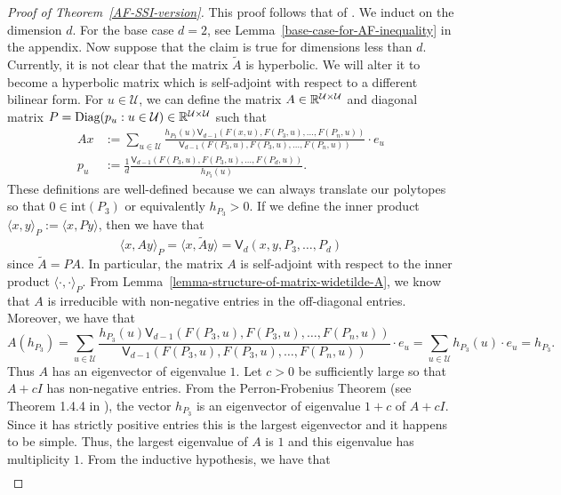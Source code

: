 \documentclass{puthesis-UG}
\begin{document}
\begin{proof}[Proof of Theorem~\ref{AF-SSI-version}]
	This proof follows that of \cite{bochner}. We induct on the dimension $d$. For the base case $d = 2$, see Lemma~\ref{base-case-for-AF-inequality} in the appendix. Now suppose that the claim is true for dimensions less than $d$. Currently, it is not clear that the matrix $\widetilde{A}$ is hyperbolic. We will alter it to become a hyperbolic matrix which is self-adjoint with respect to a different bilinear form. For $u \in \mathcal{U}$, we can define the matrix $A \in \mathbb{R}^{\mathcal{U} \times \mathcal{U}}$ and diagonal matrix $P = \text{Diag}(p_u : u \in \mathcal{U}) \in \mathbb{R}^{\mathcal{U} \times \mathcal{U}}$ such that 
	\begin{align*}
		Ax & := \sum_{u \in \mathcal{U}} \frac{h_{P_3}(u) \mathsf{V}_{d-1} (F(x, u), F(P_3, u), \ldots, F(P_n, u))}{\mathsf{V}_{d-1}(F(P_3, u), F(P_3, u), \ldots, F(P_n, u))} \cdot e_u\\
		p_u & := \frac{1}{d} \frac{\mathsf{V}_{d-1} (F(P_3, u), F(P_3, u), \ldots, F(P_d, u))}{h_{P_3}(u)}.
	\end{align*}
	These definitions are well-defined because we can always translate our polytopes so that $0 \in \text{int}(P_3)$ or equivalently $h_{P_3} > 0$. If we define the inner product $\langle x, y \rangle_{P} := \langle x, P y \rangle$, then we have that 
	\[
		\langle x, Ay \rangle_P = \langle x, \widetilde{A} y \rangle = \mathsf{V}_d (x, y, P_3, \ldots, P_d)
	\]
	since $\widetilde{A} = PA$. In particular, the matrix $A$ is self-adjoint with respect to the inner product $\langle \cdot, \cdot \rangle_P$. From Lemma~\ref{lemma-structure-of-matrix-widetilde-A}, we know that $A$ is irreducible with non-negative entries in the off-diagonal entries. Moreover, we have that 
	\[
		A(h_{P_3}) = \sum_{u \in \mathcal{U}}\frac{h_{P_3}(u) \mathsf{V}_{d-1} (F(P_3, u), F(P_3, u), \ldots, F(P_n, u))}{\mathsf{V}_{d-1}(F(P_3, u), F(P_3, u), \ldots, F(P_n, u))} \cdot e_u = \sum_{u \in \mathcal{U}} h_{P_3}(u) \cdot e_u = h_{P_3}.
	\]
	Thus $A$ has an eigenvector of eigenvalue $1$. Let $c > 0$ be sufficiently large so that $A + c I$ has non-negative entries. From the Perron-Frobenius Theorem (see Theorem 1.4.4 in \cite{bapat_raghavan_1997}), the vector $h_{P_3}$ is an eigenvector of eigenvalue $1 + c$ of $A + cI$. Since it has strictly positive entries this is the largest eigenvector and it happens to be simple. Thus, the largest eigenvalue of $A$ is $1$ and this eigenvalue has multiplicity $1$. From the inductive hypothesis, we have that
	\begin{align*}

\end{align*}
\end{proof}
\end{document}
